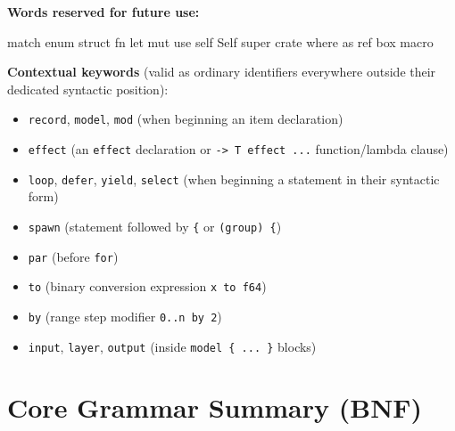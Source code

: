 \documentclass[
  english,
  oneside]{book}
\newenvironment{Shaded}{\begin{snugshade}}{\end{snugshade}}
\newcommand{\NormalTok}[1]{\textcolor[rgb]{0.83,0.83,0.83}{#1}}
\providecommand{\tightlist}{%
  \setlength{\itemsep}{0pt}\setlength{\parskip}{0pt}}
\begin{document}
\textbf{Words reserved for future use:}

\begin{Shaded}
\begin{Highlighting}[]
\NormalTok{match  enum  struct  fn  let  mut  use  self  Self  super  crate  where  as  ref  box  macro}
\end{Highlighting}
\end{Shaded}

\textbf{Contextual keywords} (valid as ordinary identifiers everywhere
outside their dedicated syntactic position):

\begin{itemize}
\tightlist
\item
  \texttt{record}, \texttt{model}, \texttt{mod} (when beginning an item
  declaration)
\item
  \texttt{effect} (an \texttt{effect} declaration or
  \texttt{-\textgreater{}\ T\ effect\ ...} function/lambda clause)
\item
  \texttt{loop}, \texttt{defer}, \texttt{yield}, \texttt{select} (when
  beginning a statement in their syntactic form)
\item
  \texttt{spawn} (statement followed by \texttt{\{} or
  \texttt{(group)\ \{})
\item
  \texttt{par} (before \texttt{for})
\item
  \texttt{to} (binary conversion expression \texttt{x\ to\ f64})
\item
  \texttt{by} (range step modifier \texttt{0..n\ by\ 2})
\item
  \texttt{input}, \texttt{layer}, \texttt{output} (inside
  \texttt{model\ \{\ ...\ \}} blocks)
\end{itemize}

\section{Core Grammar Summary (BNF)}\label{core-grammar-summary-bnf}
\end{document}
